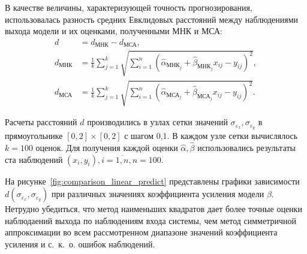 В качестве величины, характеризующей точность прогнозирования,
использовалась разность средних Евклидовых расстояний между наблюдениями выхода модели и
их оценками, полученными МНК и МСА:
\begin{equation*}
  \begin{aligned}
    d &= d_{\text{МНК}} - d_{\text{МСА}}, \\
    d_{\text{МНК}} &= \frac{1}{k} \sum_{j=1}^k \sqrt{ \sum_{i=1}^n (\hat{\alpha}_{\text{МНК}_j} + \hat{\beta}_{\text{МНК}_j} x_{ij} - y_{ij})^2}, \\
    d_{\text{МСА}} &= \frac{1}{k} \sum_{j=1}^k \sqrt{ \sum_{i=1}^n (\hat{\alpha}_{\text{МСА}_j} + \hat{\beta}_{\text{МСА}_j} x_{ij} - y_{ij})^2}.
    \end{aligned}
\end{equation*}

Расчеты расстояний \( d \) производились в узлах сетки значений
\( \sigma_{\varepsilon_x}, \sigma_{\varepsilon_y} \) в прямоугольнике
\( [0, 2] \times [0, 2] \) с шагом 0{,}1.
В каждом узле сетки вычислялось \( k = 100 \) оценок.
Для получения каждой оценки \( \hat{\alpha}, \hat{\beta} \) использовались результаты
ста наблюдений \( ( x_i, y_i ), i = \overline{1, n}, n = 100 \).

На рисунке~\ref{fig:comparison_linear_predict} представлены графики зависимости
\( d(\sigma_{\varepsilon_x}, \sigma_{\varepsilon_y}) \) при различных значениях
коэффициента усиления модели \( \beta \).
Нетрудно убедиться, что метод наименьших квадратов дает более точные оценки наблюдаений
выхода по наблюдениям входа системы, чем метод симметричной аппроксимации
во всем рассмотренном диапазоне значений коэффициента усиления и с.~к.~о. ошибок наблюдений.

